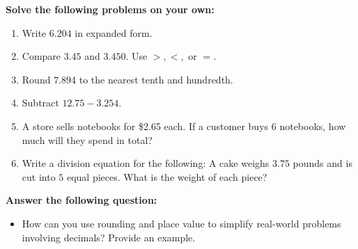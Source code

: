 \documentclass[12pt]{article}
\begin{document}
\begin{tcolorbox}[colframe=black!60, colback=white, 
coltitle=black, colbacktitle=black!15, fonttitle=\bfseries\Large, 
title=Independent Practice, halign title=center, left=10pt, right=10pt, top=10pt, bottom=15pt]
\textbf{Solve the following problems on your own:}
\begin{enumerate}[itemsep=3em]
    \item Write \( 6.204 \) in expanded form.
    \item Compare \( 3.45 \) and \( 3.450 \). Use \( >, <, \) or \( = \).
    \item Round \( 7.894 \) to the nearest tenth and hundredth.
    \item Subtract \( 12.75 - 3.254 \).
    \item A store sells notebooks for \$2.65 each. If a customer buys \( 6 \) notebooks, how much will they spend in total?
    \item Write a division equation for the following: A cake weighs \( 3.75 \) pounds and is cut into \( 5 \) equal pieces. What is the weight of each piece?
\end{enumerate}
\end{tcolorbox}

\vspace{1em}

\begin{tcolorbox}[colframe=black!60, colback=white, 
coltitle=black, colbacktitle=black!15, fonttitle=\bfseries\Large, 
title=Exit Ticket, halign title=center, left=10pt, right=10pt, top=10pt, bottom=15pt]
\textbf{Answer the following question:}
\begin{itemize}
    \item How can you use rounding and place value to simplify real-world problems involving decimals? Provide an example.
\end{itemize}
\end{tcolorbox}
\end{document}
